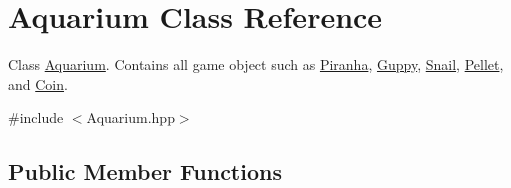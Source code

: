 \hypertarget{class_aquarium}{}\section{Aquarium Class Reference}
\label{class_aquarium}


Class \mbox{\hyperlink{class_aquarium}{Aquarium}}. Contains all game object such as \mbox{\hyperlink{class_piranha}{Piranha}}, \mbox{\hyperlink{class_guppy}{Guppy}}, \mbox{\hyperlink{class_snail}{Snail}}, \mbox{\hyperlink{class_pellet}{Pellet}}, and \mbox{\hyperlink{class_coin}{Coin}}.  




{\ttfamily \#include $<$Aquarium.\+hpp$>$}

\subsection*{Public Member Functions}
